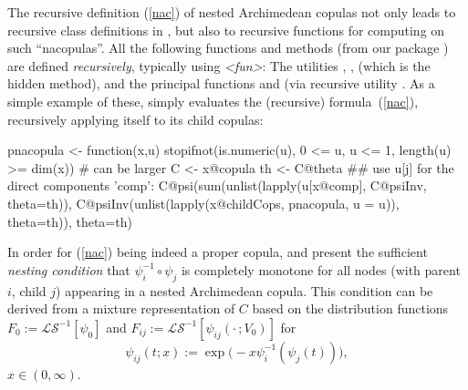 \documentclass[nojss,article]{jss}
\theoremstyle{mythmstyle}
\newcommand*{\R}{\proglang{R}}%
\newcommand*{\psiis}[1]{{\psi_{#1}^{-1}}}
\newcommand*{\LS}{\mathcal{LS}}
\newcommand*{\LSi}{\LS^{-1}}
\newcommand*{\textcite}[2][]{\citet[#1]{#2}}
\begin{document}
The recursive definition (\ref{nac}) of nested Archimedean copulas not only leads to
recursive class definitions in \R, but also to recursive functions for
computing on such ``nacopulas''.
All the following functions and methods (from our package )
are defined \emph{recursively}, typically using
 \textit{<fun>}\code{)}:
The utilities , ,  (which is the hidden
 method), and the principal functions
 and  (via recursive utility .
As a simple example of these,  simply evaluates the
(recursive) formula~(\ref{nac}), recursively applying itself to its child copulas:
\begin{Schunk}
\begin{Sinput}
pnacopula <- function(x,u) {
    stopifnot(is.numeric(u), 0 <= u, u <= 1, length(u) >= dim(x)) # can be larger
    C <- x@copula
    th <- C@theta
    ## use u[j] for the direct components 'comp':
    C@psi(sum(unlist(lapply(u[x@comp], C@psiInv, theta=th)),
              C@psiInv(unlist(lapply(x@childCops, pnacopula, u = u)),
                       theta=th)),
          theta=th)
}
\end{Sinput}
\end{Schunk}


In order for (\ref{nac}) being indeed a proper copula,
\textcite[p.\ 88]{joe1997} and \textcite{mcneil2008} present the sufficient
\textit{nesting condition} that $\psiis{i}\circ\psi_{j}$ is completely
monotone for all nodes (with parent $i$, child $j$) appearing in a nested
Archimedean copula.
This condition can be derived from a mixture representation of $C$ based on
the distribution functions $F_0:=\LSi[\psi_0]$ and
$F_{ij}:=\LSi[\psi_{ij}(\cdot\,;V_0)]$ for
\begin{equation*}
  \psi_{ij}(t;x):=\exp\bigl(-x\psiis{i}(\psi_{j}(t))\bigr),
\end{equation*}
$x\in(0,\infty)$.
\end{document}
